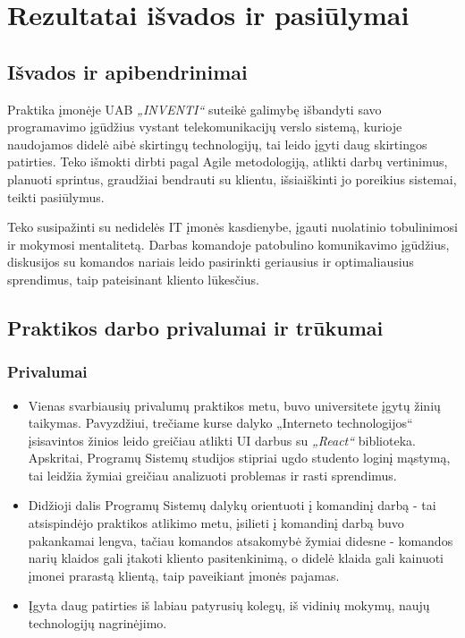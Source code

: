 \section{Rezultatai išvados ir pasiūlymai}

\subsection{Išvados ir apibendrinimai}

Praktika įmonėje UAB \textit{„INVENTI“} suteikė galimybę išbandyti savo programavimo įgūdžius vystant telekomunikacijų verslo sistemą,
kurioje naudojamos didelė aibė skirtingų technologijų, tai leido įgyti daug skirtingos patirties. Teko išmokti dirbti pagal Agile metodologiją,
atlikti darbų vertinimus, planuoti sprintus, graudžiai bendrauti su klientu, išsiaiškinti jo poreikius sistemai, teikti pasiūlymus.

Teko susipažinti su nedidelės IT įmonės kasdienybe, įgauti nuolatinio tobulinimosi ir mokymosi mentalitetą. Darbas komandoje patobulino komunikavimo įgūdžius,
diskusijos su komandos nariais leido pasirinkti geriausius ir optimaliausius sprendimus, taip pateisinant kliento lūkesčius.

\subsection{Praktikos darbo privalumai ir trūkumai}

\subsubsection{Privalumai}

\begin{itemize}
    \item Vienas svarbiausių privalumų praktikos metu, buvo universitete įgytų žinių taikymas. Pavyzdžiui, trečiame kurse dalyko „Interneto technologijos“ įsisavintos žinios leido greičiau
    atlikti UI darbus su \textit{„React“} biblioteka. Apskritai, Programų Sistemų studijos stipriai ugdo studento loginį mąstymą, tai leidžia žymiai greičiau
    analizuoti problemas ir rasti sprendimus.
    \item Didžioji dalis Programų Sistemų dalykų orientuoti į komandinį darbą - tai atsispindėjo praktikos atlikimo metu, įsilieti į komandinį darbą buvo pakankamai lengva,
    tačiau komandos atsakomybė žymiai didesne - komandos narių klaidos gali įtakoti kliento pasitenkinimą, o didelė klaida gali kainuoti įmonei prarastą klientą, taip paveikiant
    įmonės pajamas.
    \item Įgyta daug patirties iš labiau patyrusių kolegų, iš vidinių mokymų, naujų technologijų nagrinėjimo.
\end{itemize}


